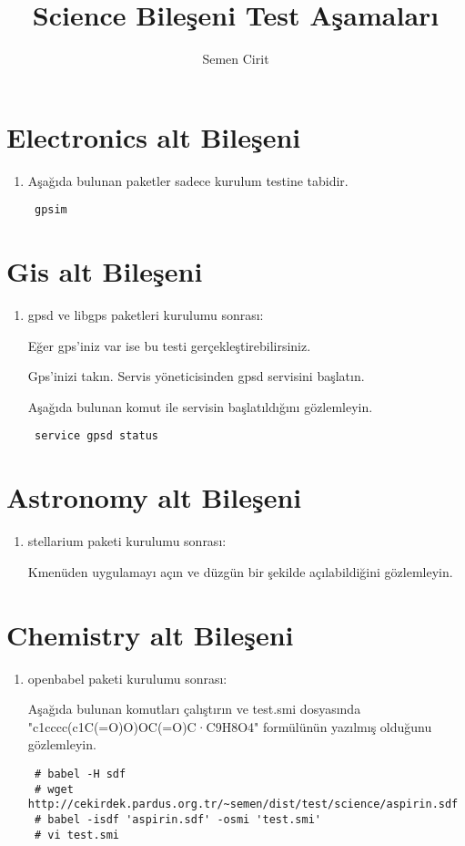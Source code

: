 \documentclass[a4paper,10pt]{article}
\title{Science Bileşeni Test Aşamaları}
\author{Semen Cirit}
\begin{document}
\maketitle
\section{Electronics alt Bileşeni}
\begin{enumerate}
 \item Aşağıda bulunan paketler sadece kurulum testine tabidir.
\begin{verbatim}
 gpsim
\end{verbatim}

\end{enumerate}


\section{Gis alt Bileşeni}
\begin{enumerate}
 \item gpsd ve libgps paketleri kurulumu sonrası:

Eğer gps'iniz var ise bu testi gerçekleştirebilirsiniz.

Gps'inizi takın. Servis yöneticisinden gpsd servisini başlatın.

Aşağıda bulunan komut ile servisin başlatıldığını gözlemleyin.
\begin{verbatim}
 service gpsd status
\end{verbatim}


\end{enumerate}


\section{Astronomy alt Bileşeni}
\begin{enumerate}
 \item stellarium paketi kurulumu sonrası:

Kmenüden uygulamayı açın ve düzgün bir şekilde açılabildiğini gözlemleyin. 
\end{enumerate}

\section{Chemistry alt Bileşeni}
\begin{enumerate}
 \item openbabel paketi kurulumu sonrası:

Aşağıda bulunan komutları çalıştırın ve test.smi dosyasında "c1cccc(c1C(=O)O)OC(=O)C·C9H8O4" formülünün yazılmış olduğunu gözlemleyin.
\begin{verbatim}
 # babel -H sdf
 # wget http://cekirdek.pardus.org.tr/~semen/dist/test/science/aspirin.sdf
 # babel -isdf 'aspirin.sdf' -osmi 'test.smi'
 # vi test.smi
\end{verbatim}

\end{enumerate}
\end{document}
